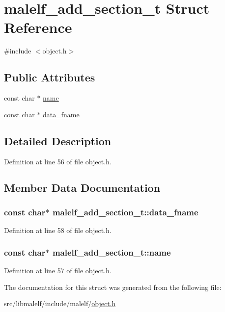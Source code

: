 \hypertarget{structmalelf__add__section__t}{
\section{malelf\_\-add\_\-section\_\-t Struct Reference}
\label{structmalelf__add__section__t}
}


{\ttfamily \#include $<$object.h$>$}

\subsection*{Public Attributes}
\begin{DoxyCompactItemize}
\item 
const char $\ast$ \hyperlink{structmalelf__add__section__t_a6f46f282d559886a9626822f1a073428}{name}
\item 
const char $\ast$ \hyperlink{structmalelf__add__section__t_a094c67dd6768305395085f96549def2f}{data\_\-fname}
\end{DoxyCompactItemize}


\subsection{Detailed Description}


Definition at line 56 of file object.h.



\subsection{Member Data Documentation}
\hypertarget{structmalelf__add__section__t_a094c67dd6768305395085f96549def2f}{
\subsubsection[{data\_\-fname}]{\setlength{\rightskip}{0pt plus 5cm}const char$\ast$ {\bf malelf\_\-add\_\-section\_\-t::data\_\-fname}}}
\label{structmalelf__add__section__t_a094c67dd6768305395085f96549def2f}


Definition at line 58 of file object.h.

\hypertarget{structmalelf__add__section__t_a6f46f282d559886a9626822f1a073428}{
\subsubsection[{name}]{\setlength{\rightskip}{0pt plus 5cm}const char$\ast$ {\bf malelf\_\-add\_\-section\_\-t::name}}}
\label{structmalelf__add__section__t_a6f46f282d559886a9626822f1a073428}


Definition at line 57 of file object.h.



The documentation for this struct was generated from the following file:\begin{DoxyCompactItemize}
\item 
src/libmalelf/include/malelf/\hyperlink{object_8h}{object.h}\end{DoxyCompactItemize}
